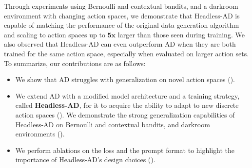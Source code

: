 Through experiments using Bernoulli and contextual bandits, and a darkroom environment with changing action spaces, we demonstrate that Headless-AD is capable of matching the performance of the original data generation algorithm and scaling to action spaces up to $\textbf{5x}$ larger than those seen during training. We also observed that Headless-AD can even outperform AD when they are both trained for the same action space, especially when evaluated on larger action sets. To summarize, our contributions are as follows:
\begin{itemize}
    \item We show that AD struggles with generalization on novel action spaces ().
    \item We extend AD with a modified model architecture and a training strategy, called \textbf{Headless-AD}, for it to acquire the ability to adapt to new discrete action spaces (). We demonstrate the strong generalization capabilities of Headless-AD on Bernoulli and contextual bandits, and darkroom environments ().
    \item We perform ablations on the loss and the prompt format to highlight the importance of Headless-AD's design choices ().
\end{itemize}
\vphantom{loh}\\

